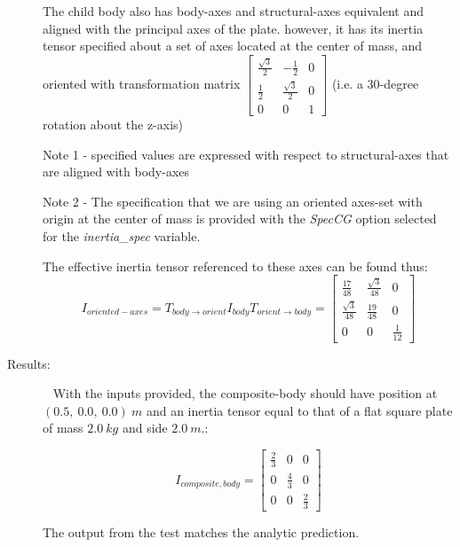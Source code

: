 \begin{description}
The child body also has body-axes and structural-axes equivalent and aligned
with the principal axes of the plate.  however, it has its inertia tensor
specified about a set of axes located at
the center of mass, and oriented with transformation
matrix
$\begin{bmatrix} \frac{\sqrt{3}}{2} & -\frac{1}{2}   & 0  \\
                   \frac{1}{2}   & \frac{\sqrt{3}}{2} & 0   \\
                    0  & 0   & 1
   \end{bmatrix}
$
(i.e. a 30-degree rotation about the z-axis)

Note 1 - specified values are expressed with respect to structural-axes that
are aligned with body-axes

Note 2 - The specification that we are using an oriented axes-set with origin
at the center of mass is provided with the \textit{SpecCG} option selected for
the \textit{inertia\_spec} variable.

The effective inertia tensor referenced to these axes can be found thus:
\begin{equation*}
I_{oriented-axes} = T_{body \rightarrow orient} I_{body} T_{orient \rightarrow
body} =
   \begin{bmatrix} \frac{17}{48} & \frac{\sqrt{3}}{48}   & 0  \\
                   \frac{\sqrt{3}}{48}   & \frac{19}{48} & 0   \\
                    0  & 0  & \frac{1}{12}
   \end{bmatrix}
\end{equation*}

\item[Results:]\ \newline
With the inputs provided, the composite-body should have position at $(0.5,
~0.0, ~0.0)~m$ and an inertia tensor equal to that of a flat square plate of
mass $2.0 ~kg$ and side $2.0 ~m$.:

\begin{equation*}
I_{composite, body} =
   \begin{bmatrix} \frac{2}{3} & 0 & 0  \\
                   0   & \frac{4}{3} & 0   \\
                    0  & 0  & \frac{2}{3}
   \end{bmatrix}
\end{equation*}

The output from the test matches the analytic prediction.
\end{description}
















